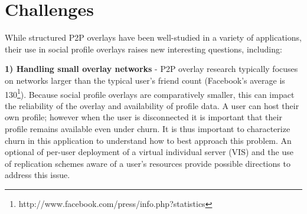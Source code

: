 \documentclass{sig-alternate}
\begin{document}

\section{Challenges}
\label{outstanding}

While structured P2P overlays have been well-studied in a variety of
applications, their use in social profile overlays raises new interesting
questions, including:

{\bf 1) Handling small overlay networks} - P2P overlay research typically
focuses on networks larger than the typical user's friend count (Facebook's
average is 130\footnote{http://www.facebook.com/press/info.php?statistics}).
Because social profile overlays are comparatively smaller, this can impact the
reliability of the overlay and availability of profile data.  A user can host
their own profile; however when the user is disconnected it is important that
their profile remains available even under churn. It is thus important to
characterize churn in this application to understand how to best approach this
problem. An optional of per-user deployment of a virtual individual server
(VIS) and the use of replication schemes aware of a user's resources provide
possible directions to address this issue.
\end{document}
